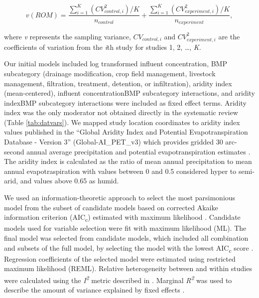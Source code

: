 \documentclass[utf8]{FrontiersinHarvard}
\begin{document}
\[
v(ROM) = \frac{\sum_{i=1}^{K}{(CV^2_{control,i})/K}}{n_{control}} + \frac{\sum_{i=1}^{K}{(CV^2_{experiment,i})/K}}{n_{experiment}},
\]

where \emph{v} represents the sampling variance, \(CV_{control,i}\) and \(CV^2_{experiment,i}\) are the coefficients of variation from the \emph{i}th study for studies 1, 2, \ldots, \emph{K}.

Our initial models included log transformed influent concentration, BMP subcategory (drainage modification, crop field management, livestock management, filtration, treatment, detention, or infiltration), aridity index (mean-centered), influent concentration\texttimes BMP subcategory interactions, and aridity index\texttimes BMP subcategory interactions were included as fixed effect terms.
Aridity index was the only moderator not obtained directly in the systematic review (Table \ref{tab:datvars}).
We mapped study location coordinates to aridity index values published in the ``Global Aridity Index and Potential Evapotranspiration Database - Version 3'' (Global-AI\_PET\_v3) which provides gridded 30 arc-second annual average precipitation and potential evapotranspiration estimates \citep{zomerVersionGlobalAridity2022}.
The aridity index is calculated as the ratio of mean annual precipitation to mean annual evapotraspiration with values between 0 and 0.5 considered hyper to semi-arid, and values above 0.65 as humid.

We used an information-theoretic approach to select the most parsimonious model from the subset of candidate models based on corrected Akaike information criterion (AIC\textsubscript{c}) estimated with maximum likelihood \citep{cinarUsingInformationTheoretic2021}.
Candidate models used for variable selection were fit with maximum likelihood (ML).
The final model was selected from candidate models, which included all combination and subsets of the full model, by selecting the model with the lowest AIC\textsubscript{c} score \citep{burnhamAICModelSelection2011, cinarUsingInformationTheoretic2021}.
Regression coefficients of the selected model were estimated using restricted maximum likelihood (REML).
Relative heterogeneity between and within studies were calculated using the \emph{I\textsuperscript{2}} metric described in \citet{nakagawaMethodologicalIssuesAdvances2012}.
Marginal \emph{R\textsuperscript{2}} was used to describe the amount of variance explained by fixed effects \citep{nakagawaGeneralSimpleMethod2013}.
\end{document}
